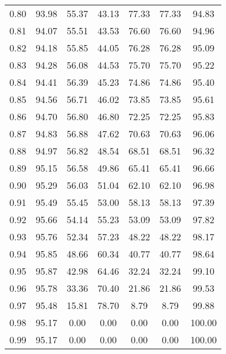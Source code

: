 \begin{tabular}{|c|c|c|c|c|c|c|}
      0.80 &     93.98 &     55.37 &      43.13 &   77.33 &      77.33 &         94.83 \\
      0.81 &     94.07 &     55.51 &      43.53 &   76.60 &      76.60 &         94.96 \\
      0.82 &     94.18 &     55.85 &      44.05 &   76.28 &      76.28 &         95.09 \\
      0.83 &     94.28 &     56.08 &      44.53 &   75.70 &      75.70 &         95.22 \\
      0.84 &     94.41 &     56.39 &      45.23 &   74.86 &      74.86 &         95.40 \\
      0.85 &     94.56 &     56.71 &      46.02 &   73.85 &      73.85 &         95.61 \\
      0.86 &     94.70 &     56.80 &      46.80 &   72.25 &      72.25 &         95.83 \\
      0.87 &     94.83 &     56.88 &      47.62 &   70.63 &      70.63 &         96.06 \\
      0.88 &     94.97 &     56.82 &      48.54 &   68.51 &      68.51 &         96.32 \\
      0.89 &     95.15 &     56.58 &      49.86 &   65.41 &      65.41 &         96.66 \\
      0.90 &     95.29 &     56.03 &      51.04 &   62.10 &      62.10 &         96.98 \\
      0.91 &     95.49 &     55.45 &      53.00 &   58.13 &      58.13 &         97.39 \\
      0.92 &     95.66 &     54.14 &      55.23 &   53.09 &      53.09 &         97.82 \\
      0.93 &     95.76 &     52.34 &      57.23 &   48.22 &      48.22 &         98.17 \\
      0.94 &     95.85 &     48.66 &      60.34 &   40.77 &      40.77 &         98.64 \\
      0.95 &     95.87 &     42.98 &      64.46 &   32.24 &      32.24 &         99.10 \\
      0.96 &     95.78 &     33.36 &      70.40 &   21.86 &      21.86 &         99.53 \\
      0.97 &     95.48 &     15.81 &      78.70 &    8.79 &       8.79 &         99.88 \\
      0.98 &     95.17 &      0.00 &       0.00 &    0.00 &       0.00 &        100.00 \\
      0.99 &     95.17 &      0.00 &       0.00 &    0.00 &       0.00 &        100.00 \\
\bottomrule
\end{tabular}
